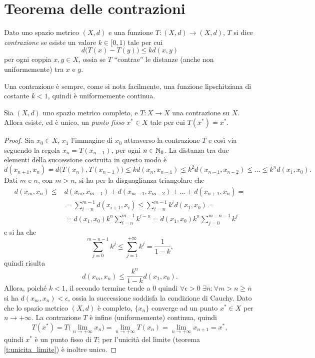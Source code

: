 \section{Teorema delle contrazioni}
\begin{definizione}
Dato uno spazio metrico $(X,d)$ e una funzione $T\colon(X,d)\to(X,d)$, $T$ si dice \emph{contrazione} se esiste un valore $k\in[0,1)$ tale per cui
\[
d\big(T(x)-T(y)\big)\leq k d(x,y)
\]
per ogni coppia $x,y\in X$, ossia se $T$ ``contrae'' le distanze (anche non uniformemente) tra $x$ e $y$.
\end{definizione}
Una contrazione è sempre, come si nota facilmente, una funzione lipschitziana di costante $k<1$, quindi è uniformemente continua.
\begin{teorema} \label{t:contrazioni}
Sia $(X,d)$ uno spazio metrico completo, e $T\colon X\to X$ una contrazione su $X$. Allora esiste, ed è unico, un \emph{punto fisso} $x^*\in X$ tale per cui $T(x^*)=x^*$.
\end{teorema}
\begin{proof}
Sia $x_0\in X$, $x_1$ l'immagine di $x_0$ attraverso la contrazione $T$ e così via seguendo la regola $x_n=T(x_{n-1})$, per ogni $n\in\mathbb{N}_0$. La distanza tra due elementi della successione costruita in questo modo è
\begin{equation*}
d(x_{n+1},x_n)=d\big(T(x_n),T(x_{n-1})\big)\leq kd(x_n,x_{n-1})\leq k^2d(x_{n-1},x_{n-2})\leq\dots\leq k^nd(x_1,x_0).
\end{equation*}
Dati $m$ e $n$, con $m>n$, si ha per la disguaglianza triangolare che
\begin{equation}
\begin{split}
d(x_m,x_n)\leq	&d(x_m,x_{m-1})+d(x_{m-1},x_{m-2})+\dots+d(x_{n+1},x_n)=\\
				&=\sum_{i=n}^{m-1}d(x_{i+1},x_i)\leq\sum_{i=n}^{m-1}k^id(x_1,x_0)=\\
				&=d(x_1,x_0)k^n\sum_{i=n}^{m-1}k^{i-n}=d(x_1,x_0)k^n\sum_{j=0}^{m-n-1}k^j
\end{split}
\end{equation}
e si ha che
\[
\sum_{j=0}^{m-n-1}k^j\leq\sum_{j=1}^{+\infty}k^j=\frac1{1-k},
\]
quindi risulta
\begin{equation}
d(x_m,x_n)\leq\frac{k^n}{1-k}d(x_1,x_0).
\end{equation}
Allora, poiché $k<1$, il secondo termine tende a 0 quindi $\forall\epsilon>0$ $\exists\overline{n}\colon\forall m>n\geq\overline{n}$ si ha $d(x_m,x_n)<\epsilon$, ossia la successione soddisfa la condizione di Cauchy. Dato che lo spazio metrico $(X,d)$ è completo, $\{x_n\}$ converge ad un punto $x^*\in X$ per $n\to+\infty$.
La contrazione $T$ è infine (uniformemente) continua, quindi
\[
T(x^*)=T\Big(\lim_{n\to+\infty}x_n\Big)=\lim_{n\to+\infty} T(x_n)=\lim_{n\to+\infty} x_{n+1}=x^*,
\]
quindi $x^*$ è un punto fisso di $T$; per l'unicità del limite (teorema \ref{t:unicita_limite}) è inoltre unico.
\end{proof}
